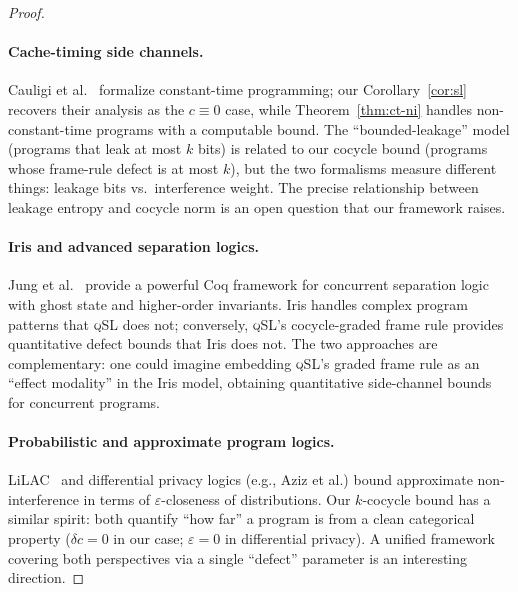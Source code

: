 \documentclass[acmsmall,sigplan,anonymous,review,screen]{acmart}
\theoremstyle{plain}
\theoremstyle{definition}
\newcommand{\qSL}{\textsc{qSL}\xspace}
\begin{document}
\begin{proof}
\paragraph{Cache-timing side channels.}
Cauligi et al.~\cite{cauligi2020constant} formalize constant-time
programming; our Corollary~\ref{cor:sl} recovers their analysis as the
$c \equiv 0$ case, while Theorem~\ref{thm:ct-ni} handles non-constant-time
programs with a computable bound.  The ``bounded-leakage'' model
(programs that leak at most $k$ bits) is related to our cocycle
bound (programs whose frame-rule defect is at most $k$), but the two
formalisms measure different things: leakage bits vs.\ interference weight.
The precise relationship between leakage entropy and cocycle norm is
an open question that our framework raises.

\paragraph{Iris and advanced separation logics.}
Jung et al.~\cite{jung2018iris} provide a powerful Coq framework for
concurrent separation logic with ghost state and higher-order invariants.
Iris handles complex program patterns that \qSL does not; conversely,
\qSL's cocycle-graded frame rule provides quantitative defect bounds that
Iris does not.  The two approaches are complementary: one could imagine
embedding \qSL's graded frame rule as an ``effect modality'' in the
Iris model, obtaining quantitative side-channel bounds for concurrent
programs.

\paragraph{Probabilistic and approximate program logics.}
LiLAC~\cite{barthe2019probabilistic} and differential privacy logics
(e.g., Aziz et al.) bound approximate non-interference in terms of
$\varepsilon$-closeness of distributions.  Our $k$-cocycle bound has a
similar spirit: both quantify ``how far'' a program is from a clean
categorical property ($\delta c = 0$ in our case; $\varepsilon = 0$
in differential privacy).  A unified framework covering both perspectives
via a single ``defect'' parameter is an interesting direction.


\end{proof}
\end{document}
